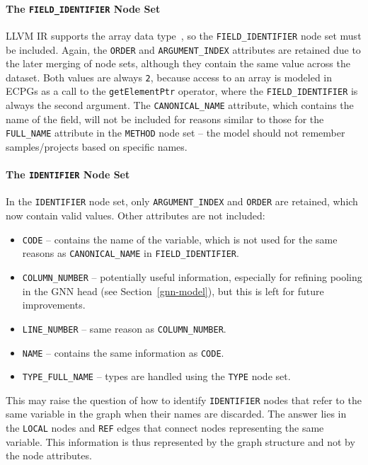 \paragraph{The \texttt{FIELD\_IDENTIFIER} Node Set}
LLVM IR supports the array data type~\cite{LLVM-IR}, so the \texttt{FIELD\_IDENTIFIER} node set must be included. Again, the \texttt{ORDER} and \texttt{ARGUMENT\_INDEX} attributes are retained due to the later merging of node sets, although they contain the same value across the dataset. Both values are always \texttt{2}, because access to an array is modeled in ECPGs as a call to the \texttt{getElementPtr} operator, where the \texttt{FIELD\_IDENTIFIER} is always the second argument. The \texttt{CANONICAL\_NAME} attribute, which contains the name of the field, will not be included for reasons similar to those for the \texttt{FULL\_NAME} attribute in the \texttt{METHOD} node set -- the model should not remember samples/projects based on specific names.

\paragraph{The \texttt{IDENTIFIER} Node Set}
In the \texttt{IDENTIFIER} node set, only \texttt{ARGUMENT\_INDEX} and \texttt{ORDER} are retained, which now contain valid values. Other attributes are not included:
\begin{itemize}
    \item \texttt{CODE} -- contains the name of the variable, which is not used for the same reasons as \texttt{CANONICAL\_NAME} in \texttt{FIELD\_IDENTIFIER}.
    \item \texttt{COLUMN\_NUMBER} -- potentially useful information, especially for refining pooling in the GNN head (see Section~\ref{gnn-model}), but this is left for future improvements.
    \item \texttt{LINE\_NUMBER} -- same reason as \texttt{COLUMN\_NUMBER}.
    \item \texttt{NAME} -- contains the same information as \texttt{CODE}.
    \item \texttt{TYPE\_FULL\_NAME} -- types are handled using the \texttt{TYPE} node set.
\end{itemize}
This may raise the question of how to identify \texttt{IDENTIFIER} nodes that refer to the same variable in the graph when their names are discarded. The answer lies in the \texttt{LOCAL} nodes and \texttt{REF} edges that connect nodes representing the same variable. This information is thus represented by the graph structure and not by the node attributes.

